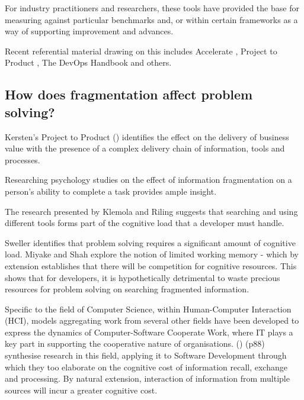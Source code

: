 For industry practitioners and researchers, these tools have provided the base for measuring against particular benchmarks and, or within certain frameworks as a way of supporting improvement and advances. 

Recent referential material drawing on this includes Accelerate \parencite{humble2018accelerate}, Project to Product \parencite{kersten2018projecproduct}, The DevOps Handbook \parencite{kim2016devops} and others.

\subsection{How does fragmentation affect problem solving?}


Kersten's Project to Product () identifies the effect on the delivery of business value with the presence of a complex delivery chain of information, tools and processes. 


Researching psychology studies on the effect of information fragmentation on a person's ability to complete a task provides ample insight. 

The research presented by Klemola and Riling \parencite*{klemola2002modeling} suggests that searching and using different tools forms part of the cognitive load that a developer must handle.

Sweller \parencite*{sweller1998cognitive} identifies that problem solving requires a significant amount of cognitive load. Miyake and Shah \parencite*{miyake1999models} explore the notion of limited working memory - which by extension establishes that there will be competition for cognitive resources. This shows that for developers, it is hypothetically detrimental to waste precious resources for problem solving on searching fragmented information.

Specific to the field of Computer Science, within Human-Computer Interaction (HCI), models aggregating work from several other fields have been developed to express the dynamics of Computer-Software Cooperate Work, where IT plays a key part in supporting the cooperative nature of organisations. \citeauthor{cscApplicationsToSoftwareDevelopment} () (p88) synthesise research in this field, applying it to Software Development through which they too elaborate on the cognitive cost of information recall, exchange and processing. By natural extension, interaction of information from multiple sources will incur a greater cognitive cost. 

